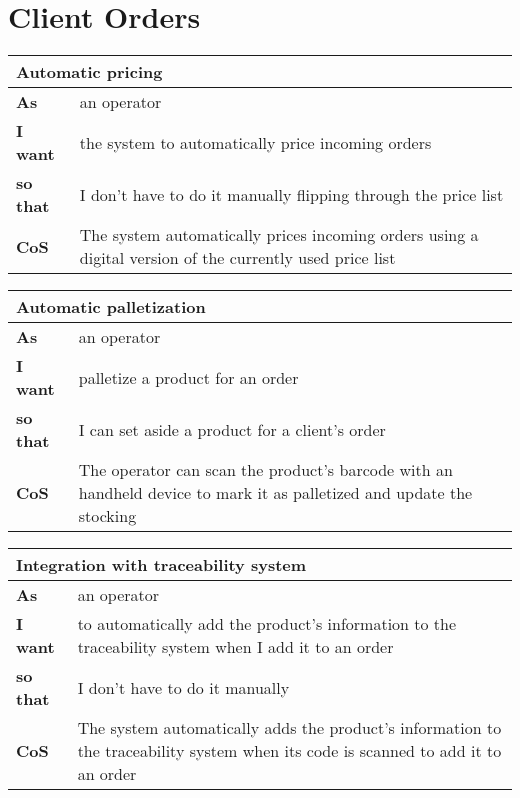 \section{Client Orders}

\begin{tabularx}{\textwidth}{lX}
  \toprule
  \multicolumn{2}{l}{\textbf{Automatic pricing}} \\
  \midrule
  \textbf{As} & an operator \\
  \textbf{I want} & the system to automatically price incoming orders \\
  \textbf{so that} & I don't have to do it manually flipping through the price list \\
  \midrule
  \textbf{CoS} & The system automatically prices incoming orders using a digital version of the currently used price list \\
  \bottomrule
\end{tabularx}

\begin{tabularx}{\textwidth}{lX}
  \toprule
  \multicolumn{2}{l}{\textbf{Automatic palletization}} \\
  \midrule
  \textbf{As} & an operator \\
  \textbf{I want} & palletize a product for an order \\
  \textbf{so that} & I can set aside a product for a client's order \\
  \midrule
  \textbf{CoS} & The operator can scan the product's barcode with an handheld device to mark it as palletized and update the stocking \\
  \bottomrule
\end{tabularx}

\begin{tabularx}{\textwidth}{lX}
  \toprule
  \multicolumn{2}{l}{\textbf{Integration with traceability system}} \\
  \midrule
  \textbf{As} & an operator \\
  \textbf{I want} & to automatically add the product's information to the traceability system when I add it to an order \\
  \textbf{so that} & I don't have to do it manually \\
  \midrule
  \textbf{CoS} & The system automatically adds the product's information to the traceability system when its code is scanned to add it to an order \\
  \bottomrule
\end{tabularx}

